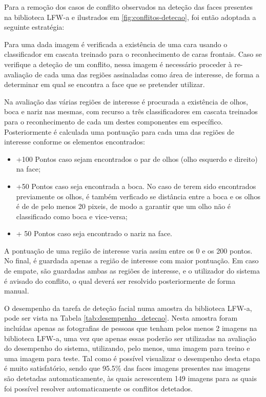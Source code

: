 Para a remoção dos casos de conflito observados na deteção das faces presentes na biblioteca LFW-a e ilustrados em \ref{fig:conflitos-detecao}, foi então adoptada a seguinte estratégia:

Para uma dada imagem é verificada a existência de uma cara usando o classificador em cascata treinado para o reconhecimento de caras frontais. Caso se verifique a deteção de um conflito, nessa imagem é necessário proceder à re-avaliação de cada uma das regiões assinaladas como área de interesse, de forma a determinar em qual se encontra a face que se pretender utilizar.

Na avaliação das várias regiões de interesse é procurada a existência de olhos, boca e nariz nas mesmas, com recurso a três classificadores em cascata treinados para o reconhecimento de cada um destes componentes em específico. Posteriormente é calculada uma pontuação para cada uma das regiões de interesse conforme os elementos encontrados:
\begin{itemize}
\item +100 Pontos caso sejam encontrados o par de olhos (olho esquerdo e direito) na face;
\item +50 Pontos caso seja encontrada a boca. No caso de terem sido encontrados previamente os olhos, é também verficado se distância entre a boca e os olhos é de de pelo menos 20 pixeis, de modo a garantir que um olho não é classificado como boca e vice-versa;
\item + 50 Pontos caso seja encontrado o nariz na face.
\end{itemize}
A pontuação de uma região de interesse varia assim entre os 0 e os 200 pontos. No final, é guardada apenas a região de interesse com maior pontuação. Em caso de empate, são guardadas ambas as regiões de interesse, e o utilizador do sistema é avisado do conflito, o qual deverá ser resolvido posteriormente de forma manual.

O desempenho da tarefa de deteção facial numa amostra da biblioteca LFW-a, pode ser vista na Tabela \ref{tab:desempenho_detecao}. Nesta amostra foram incluídas apenas as fotografias de pessoas que tenham pelos menos 2 imagens na biblioteca LFW-a, uma vez que apenas essas poderão ser utilizadas na avaliação do desempenho do sistema, utilizando, pelo menos, uma imagem para treino e uma imagem para teste. Tal como é possível visualizar o desempenho desta etapa é muito satisfatório, sendo que 95.5\% das faces imagens presentes nas imagens são detetadas automaticamente, às quais acrescentem 149 imagens para as quais foi possível resolver automaticamente os conflitos detetados.

